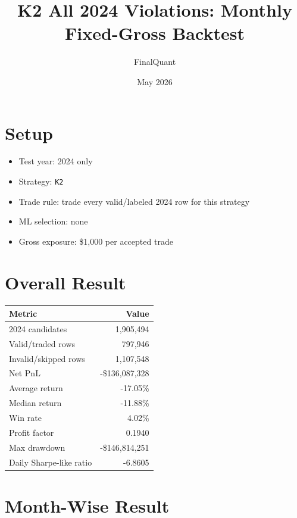 \documentclass[11pt]{article}
\title{K2 All 2024 Violations: Monthly Fixed-Gross Backtest}
\author{FinalQuant}
\date{May 2026}
\begin{document}
\maketitle

\section{Setup}

\begin{itemize}
  \item Test year: 2024 only
  \item Strategy: \texttt{K2}
  \item Trade rule: trade every valid/labeled 2024 row for this strategy
  \item ML selection: none
  \item Gross exposure: \$1,000 per accepted trade
\end{itemize}

\section{Overall Result}

\begin{center}
\begin{tabular}{@{}lr@{}}
\toprule
Metric & Value \\
\midrule
2024 candidates & 1,905,494 \\
Valid/traded rows & 797,946 \\
Invalid/skipped rows & 1,107,548 \\
Net PnL & -\$136,087,328 \\
Average return & -17.05\% \\
Median return & -11.88\% \\
Win rate & 4.02\% \\
Profit factor & 0.1940 \\
Max drawdown & -\$146,814,251 \\
Daily Sharpe-like ratio & -6.8605 \\
\bottomrule
\end{tabular}
\end{center}

\section{Month-Wise Result}
\end{document}
